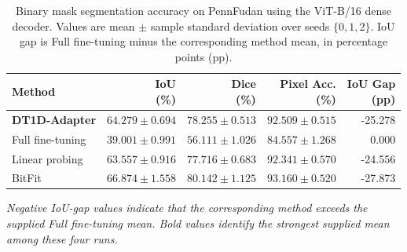 \documentclass[pdflatex,sn-mathphys-num]{sn-jnl}
\theoremstyle{thmstyleone}
\theoremstyle{thmstyletwo}
\theoremstyle{thmstylethree}
\begin{document}
\begin{table}[!htbp]
\centering
\caption{Binary mask segmentation accuracy on PennFudan using the ViT-B/16 dense decoder. Values are mean $\pm$ sample standard deviation over seeds $\{0,1,2\}$. IoU gap is Full fine-tuning minus the corresponding method mean, in percentage points (pp).}
\label{tab:seg_acc_vit_pennfudan}
\scriptsize
\setlength{\tabcolsep}{3pt}
\renewcommand{\arraystretch}{1.12}
\begin{tabularx}{\columnwidth}{@{}Xrrrr@{}}
\toprule
\textbf{Method} &
\makecell{\textbf{IoU}\\\textbf{(\%)}} &
\makecell{\textbf{Dice}\\\textbf{(\%)}} &
\makecell{\textbf{Pixel Acc.}\\\textbf{(\%)}} &
\makecell{\textbf{IoU Gap}\\\textbf{(pp)}} \\
\midrule
\textbf{DT1D-Adapter} & $64.279\pm0.694$ & $78.255\pm0.513$ & $92.509\pm0.515$ & -25.278 \\
Full fine-tuning & $39.001\pm0.991$ & $56.111\pm1.026$ & $84.557\pm1.268$ & 0.000 \\
Linear probing & $63.557\pm0.916$ & $77.716\pm0.683$ & $92.341\pm0.570$ & -24.556 \\
BitFit~\cite{zaken2022bitfit} & $\mathbf{66.874\pm1.558}$ & $\mathbf{80.142\pm1.125}$ & $\mathbf{93.160\pm0.520}$ & -27.873 \\
\bottomrule
\end{tabularx}

\vspace{2pt}
{\footnotesize\textit{Negative IoU-gap values indicate that the corresponding method exceeds the supplied Full fine-tuning mean. Bold values identify the strongest supplied mean among these four runs.}}
\end{table}
\end{document}
